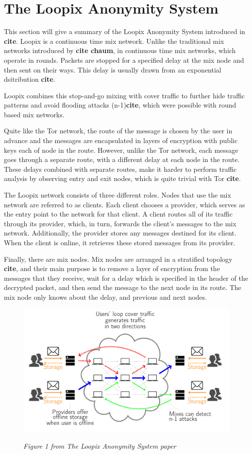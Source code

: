 \documentclass[a4paper,11pt,oneside]{report}
\begin{document}
\section{The Loopix Anonymity System}
\label{sec:loopix}
This section will give a summary of the Loopix Anonymity System introduced in \textbf{cite}. Loopix is a continuous time mix network. Unlike the traditional mix networks introduced by \textbf{cite chaum}, in continuous time mix networks, which operate in rounds. Packets are stopped for a specified delay at the mix node and then sent on their ways. This delay is usually drawn from an exponential dsitribution \textbf{cite}.

Loopix combines this stop-and-go mixing with cover traffic to further hide traffic patterns and avoid flooding attacks (n-1)\textbf{cite}, which were possible with round based mix networks.

Quite like the Tor network, the route of the message is chosen by the user in advance and the messages are encapsulated in layers of encryption with public keys each of node in the route. However, unlike the Tor network, each message goes through a separate route, with a different delay at each node in the route. These delays combined with separate routes, make it harder to perform traffic analysis by observing entry and exit nodes, which is quite trivial with Tor \textbf{cite}.

The Loopix network consists of three different roles. Nodes that use the mix network are referred to as clients. Each client chooses a provider, which serves as the entry point to the network for that client. A client routes all of its traffic through its provider, which, in turn, forwards the client’s messages to the mix network. Additionally, the provider stores any messages destined for its client. When the client is online, it retrieves these stored messages from its provider.

Finally, there are mix nodes. Mix nodes are arranged in a stratified topology \textbf{cite}, and their main purpose is to remove a layer of encryption from the messages that they receive, wait for a delay which is specified in the header of the decrypted packet, and then send the message to the next node in its route. The mix node only knows about the delay, and previous and next nodes.

\begin{figure}[H]
    \centering
    \includegraphics[width=0.8\linewidth]{plots/loopix.png}
    \caption{}
    \label{fig:loopix}
    \small\textit{Figure 1 from The Loopix Anonymity System paper}
\end{figure}
\end{document}
